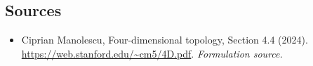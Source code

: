 \documentclass[11pt]{article}
\begin{document}
\subsection{Sources}
\begin{itemize}
\item[S1]Ciprian Manolescu, Four-dimensional topology, Section 4.4 (2024).
\url{https://web.stanford.edu/~cm5/4D.pdf}.
\textit{Formulation source.}
\end{itemize}
\end{document}
